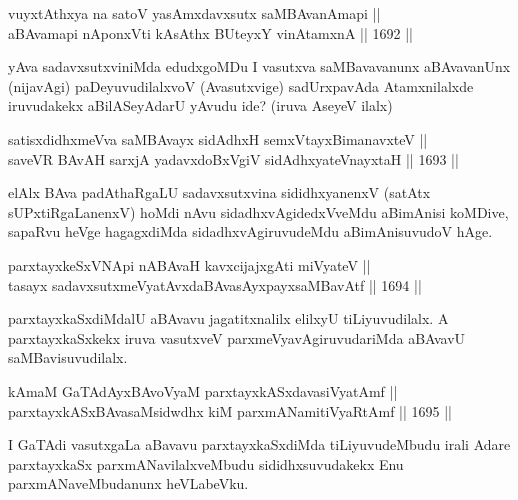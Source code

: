 \begin{shl}
vuyxtAthxya na satoV yasAmxdavxsutx saMBAvanAmapi || \\
aBAvamapi nA\s \s ponxVti kA\s \s sAthx BUteyxY vinA\s \s tamxnA \hfill || 1692 ||  
\end{shl}

\begin{artha}
yAva sadavxsutxviniMda edudxgoMDu I vasutxva saMBavavanunx aBAvavanUnx (nijavAgi) paDeyuvudilalxvoV (Avasutxvige) sadUrxpavAda Atamxnilalxde iruvudakekx aBilASeyAdarU yAvudu ide? (iruva AseyeV ilalx)
\end{artha}


\begin{shl}
satisxdidhxmeVva saMBAvayx sidAdhxH semxVtayxBimanavxteV || \\
saveVR BAvAH sarxjA yadavxdoBxVgiV sidAdhxyateV\s nayxtaH \hfill || 1693 ||  
\end{shl}	

\begin{artha}
elAlx BAva padAthaRgaLU sadavxsutxvina sididhxyanenxV (satAtx sUPxtiRgaLanenxV) hoMdi nAvu sidadhxvAgidedxVveMdu aBimAnisi koMDive, sapaRvu heVge hagagxdiMda sidadhxvAgiruvudeMdu aBimAnisuvudoV hAge.
\end{artha}


\begin{shl}
parxtayxkeSxVNApi nABAvaH kavxcijajxgAti miVyateV || \\
tasayx sadavxsutxmeVyatAvxdaBAvasAyxpayxsaMBavAtf \hfill || 1694 ||  
\end{shl}

\begin{artha}
parxtayxkaSxdiMdalU aBAvavu jagatitxnalilx elilxyU tiLiyuvudilalx. A parxtayxkaSxkekx iruva vasutxveV parxmeVyavAgiruvudariMda aBAvavU saMBavisuvudilalx.
\end{artha}

\begin{shl}
kAmaM GaTAdAyxBAvoV\s yaM parxtayxkASxdavasiVyatAmf || \\
parxtayxkASxBAvasaMsidwdhx kiM parxmANamitiVyaRtAmf \hfill || 1695 ||  
\end{shl}

\begin{artha}
I GaTAdi vasutxgaLa aBavavu parxtayxkaSxdiMda tiLiyuvudeMbudu irali Adare parxtayxkaSx parxmANavilalxveMbudu sididhxsuvudakekx Enu parxmANaveMbudanunx heVLabeVku.
\end{artha}

